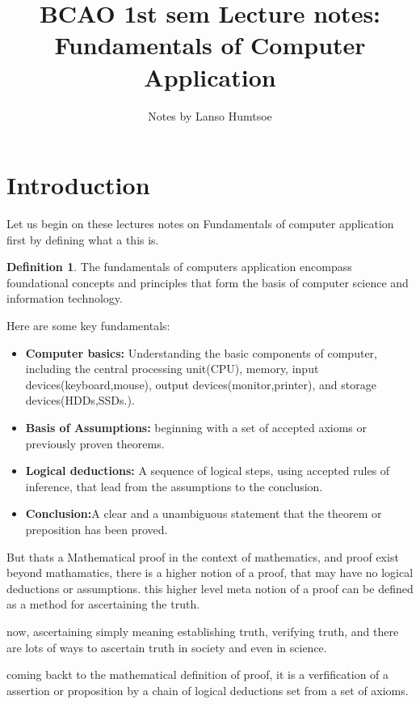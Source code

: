\documentclass{article}
\theoremstyle{definition}
\newtheorem{definition}{Definition}
\begin{document}
\title{BCAO 1st sem Lecture notes: Fundamentals of Computer Application }
\author{Notes by Lanso Humtsoe}
\maketitle
\section{Introduction}

Let us begin on these lectures notes on Fundamentals of computer application first by defining what a this is. 

\begin{definition}
The fundamentals of computers application encompass foundational concepts and principles that form the basis of computer science and information technology.
\end{definition}
 Here are some key fundamentals:

\begin{itemize}
  \item \textbf{Computer basics:} Understanding the basic components of computer, including the central processing unit(CPU), memory, input devices(keyboard,mouse), output devices(monitor,printer), and storage devices(HDDs,SSDs.).
  \item \textbf{Basis of Assumptions:} beginning with a set of accepted axioms or previously proven theorems. 
  \item \textbf{Logical deductions:} A sequence of logical steps, using accepted rules of inference, that lead from the assumptions to the conclusion.
  \item \textbf{Conclusion:}A clear and a unambiguous statement that the theorem or preposition has been proved.
\end{itemize}

But thats a Mathematical proof in the context of mathematics, and proof exist beyond mathamatics, there is a higher notion of a proof, that may have no logical deductions or assumptions.
this higher level meta notion of a proof can be defined as a method for ascertaining the truth.

now, ascertaining simply meaning establishing truth, verifying truth, and there are lots of ways to ascertain truth in society and even in science.

coming backt to the mathematical definition of proof, it is a verfification of a assertion or proposition by a chain of logical deductions set from a set of axioms. 
\end{document}
